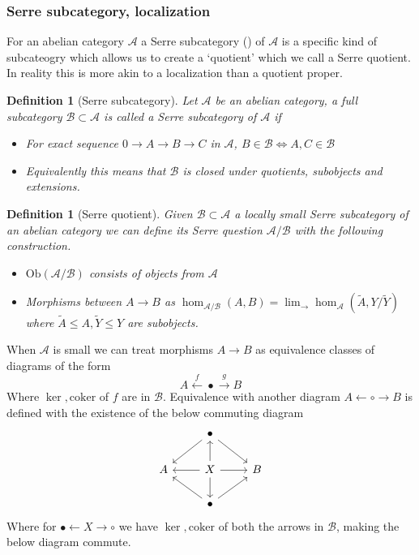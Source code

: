 \documentclass[12pt]{article}
\numberwithin{equation}{section}
\newcounter{dummy} \numberwithin{dummy}{section}
\newtheorem{definition}[dummy]{Definition}
\begin{document}
\begin{appendices}
	\subsubsection{Serre subcategory, localization}
	For an abelian category $\mathcal{A}$ a Serre subcategory () of $\mathcal{A}$ is a specific kind of subcateogry which allows us to create a `quotient' which we call a Serre quotient. In reality this is more akin to a localization than a quotient proper. 
	
	\begin{definition}[Serre subcategory]
		Let $\mathcal{A}$ be an abelian category, a full subcategory $\mathcal{B} \subset \mathcal{A}$ is called a Serre subcategory of $\mathcal{A}$ if \begin{itemize}
			\item For exact sequence $0 \to A \to B \to C $ in $\mathcal{A}$, $B \in \mathcal{B} \iff A,C \in \mathcal{B}$
			\item Equivalently this means that $\mathcal{B}$ is closed under quotients, subobjects and extensions.
		\end{itemize}
	\end{definition}
	
	\begin{definition}[Serre quotient]
		Given $\mathcal{B} \subset \mathcal{A}$ a locally small Serre subcategory of an abelian category we can define its Serre question $\mathcal{A}/\mathcal{B}$ with the following construction. \begin{itemize}
			\item $\mathrm{Ob}(\mathcal{A}/\mathcal{B})$ consists of objects from $\mathcal{A}$
			\item Morphisms between $A\to B$ as $\hom_{\mathcal{A}/\mathcal{B}} (A,B) =  \lim_\to \hom_\mathcal{A} (\tilde A, Y/\tilde Y)$ where $\tilde A \leq A, \tilde Y \leq Y$ are subobjects.
		\end{itemize}
	\end{definition}
	When $\mathcal{A}$ is small we can treat morphisms $A \to B $ as equivalence classes of diagrams of the form \[ A \xleftarrow{f} \bullet \xrightarrow{g} B \]
	Where $\ker, \mathrm{coker}$ of $f$ are in $\mathcal{B}$. Equivalence with another diagram $A \leftarrow \circ \rightarrow B$ is defined with the existence of the below commuting diagram
	\[\begin{tikzcd}
		& \bullet \\
		A & X & B \\
		& \bullet
		\arrow[from=1-2, to=2-1]
		\arrow[from=1-2, to=2-3]
		\arrow[from=2-2, to=1-2]
		\arrow[from=2-2, to=2-1]
		\arrow[from=2-2, to=2-3]
		\arrow[from=2-2, to=3-2]
		\arrow[from=3-2, to=2-1]
		\arrow[from=3-2, to=2-3]
	\end{tikzcd}\]
	Where for $\bullet \leftarrow X \rightarrow \circ $ we have $\ker,\mathrm{coker}$ of both the arrows in $\mathcal{B}$, making the below diagram commute.
	

\end{appendices}
\end{document}
